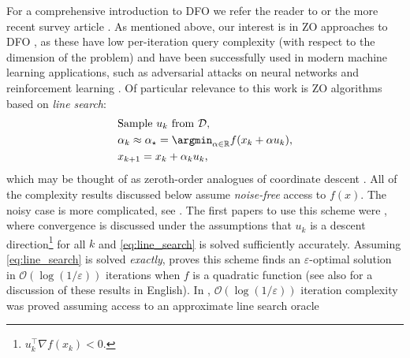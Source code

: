 For a comprehensive introduction to DFO we refer the reader to \cite{conn2009introduction} or the more recent survey article \cite{larson2019derivative}. As mentioned above, our interest is in ZO approaches to DFO \cite{liu2020primer}, as these have low per-iteration query complexity (with respect to the dimension of the problem) and have been successfully used in modern machine learning applications, such as adversarial attacks on neural networks \cite{chen2017zoo,liu2018zeroth, cheng2019sign, cai2020zeroth,cai2021zeroth} and reinforcement learning \cite{salimans2017evolution,choromanski2018structured,fazel2018global}. Of particular relevance to this work is ZO algorithms based on {\em line search}:
\begin{subequations}
    \begin{align}
         & \mathrm{Sample}\ u_k \ \mathrm{from}\  \mathcal{D}, \nonumber                                                \\
         & \alpha_k \approx \alpha_{\star} = \argmin_{\alpha \in \mathbb{R}}f(x_k + \alpha u_k), \label{eq:line_search} \\
         & x_{k+1} = x_{k} + \alpha_k u_k, \label{eq:generic_step}
    \end{align}\label{eq:GenericDFOLS}
\end{subequations}
\hspace{-0.05in}which may be thought of as zeroth-order analogues of  coordinate descent \cite{nesterov2012efficiency}. All of the complexity results discussed below assume {\em noise-free} access to $f(x)$. The noisy case is more complicated, see \cite{jamieson2012query}.
The first papers to use this scheme were \cite{karmanov1974convergence,karmanov1975convergence}, where convergence is discussed under the assumptions that $u_k$ is a descent direction\footnote{$u_{k}^{\top}\nabla f(x_k) < 0$.} for all $k$ and \eqref{eq:line_search} is solved sufficiently accurately. Assuming \eqref{eq:line_search} is solved {\em exactly}, \cite{mutsenieks1964extremal} proves this scheme finds an $\varepsilon$-optimal solution in $\mathcal{O}(\log(1/\varepsilon))$ iterations when $f$ is a quadratic function (see also \cite{schrack1976optimized} for a discussion of these results in English). In \cite{krutikov1983rate},  $\mathcal{O}(\log(1/\varepsilon))$ iteration complexity was proved assuming access to an approximate line search oracle
